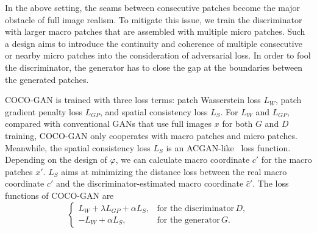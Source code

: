 \documentclass{article}
\newcommand{\modelName}{COCO-GAN }
\begin{document}
    In the above setting, the seams between consecutive patches become the major obstacle of full image realism. To mitigate this issue, we train the discriminator with larger macro patches that are assembled with multiple micro patches. Such a design aims to introduce the continuity and coherence of multiple consecutive or nearby micro patches into the consideration of adversarial loss. In order to fool the discriminator, the generator has to close the gap at the boundaries between the generated patches.  
    


    \modelName is trained with three loss terms: patch Wasserstein loss $L_W$, patch gradient penalty loss $L_{GP}$, and spatial consistency loss $L_S$. For $L_W$ and $L_{GP}$, compared with conventional GANs that use full images $x$ for both $G$ and $D$ training, \modelName only cooperates with macro patches and micro patches. Meanwhile, the spatial consistency loss $L_S$ is an ACGAN-like~\cite{ACGAN} loss function. Depending on the design of $\varphi$, we can calculate macro coordinate $c'$ for the macro patches $x'$. $L_S$ aims at minimizing the distance loss between the real macro coordinate $c'$ and the discriminator-estimated macro coordinate $\hat{c}'$. The loss functions of \modelName are
    \begin{equation}
        \begin{cases}
            L_W + \lambda L_{GP} + \alpha L_S, & \text{for the discriminator} \, D, \\
            - L_W + \alpha L_S,        & \text{for the generator} \, G.
        \end{cases}
    \end{equation}
\end{document}
